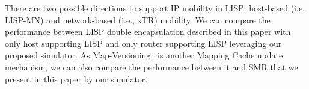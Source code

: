 There are two possible directions to support IP mobility in LISP: host-based (i.e. LISP-MN) and network-based (i.e., xTR) mobility. We can compare the performance between LISP double encapsulation described in this paper with only host supporting LISP and only router supporting LISP leveraging our proposed simulator. As Map-Versioning~\cite{rfc6834} is another Mapping Cache update mechanism, we can also compare the performance between it and SMR that we present in this paper by our simulator.
